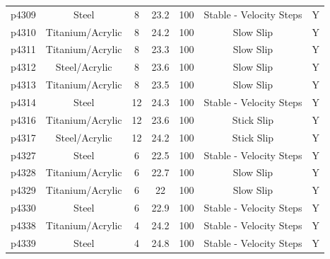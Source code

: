 \documentclass[11pt]{article}
\begin{document}
\begin{center}
\begin{table}
\begin{tabular}{ | c c c c c c c | }
p4309      & Steel            & 8                   & 23.2            & 100                   & Stable - Velocity Steps         & Y              \\
p4310      & Titanium/Acrylic & 8                   & 24.2            & 100                   & Slow Slip                       & Y              \\
p4311      & Titanium/Acrylic & 8                   & 23.3            & 100                   & Slow Slip                       & Y              \\
p4312      & Steel/Acrylic    & 8                   & 23.6            & 100                   & Slow Slip                       & Y              \\
p4313      & Titanium/Acrylic & 8                   & 23.5            & 100                   & Slow Slip                       & Y              \\
p4314      & Steel            & 12                  & 24.3            & 100                   & Stable - Velocity Steps         & Y              \\
p4316      & Titanium/Acrylic & 12                  & 23.6            & 100                   & Stick Slip                      & Y              \\
p4317      & Steel/Acrylic    & 12                  & 24.2            & 100                   & Stick Slip                      & Y              \\
p4327      & Steel            & 6                   & 22.5            & 100                   & Stable - Velocity Steps         & Y              \\
p4328      & Titanium/Acrylic & 6                   & 22.7            & 100                   & Slow Slip                       & Y              \\
p4329      & Titanium/Acrylic & 6                   & 22              & 100                   & Slow Slip                       & Y              \\
p4330      & Steel            & 6                   & 22.9            & 100                   & Stable - Velocity Steps         & Y              \\
p4338      & Titanium/Acrylic & 4                   & 24.2            & 100                   & Stable - Velocity Steps         & Y              \\
p4339      & Steel            & 4                   & 24.8            & 100                   & Stable - Velocity Steps         & Y              \\

\end{tabular}
\end{table}
\end{center}
\end{document}
